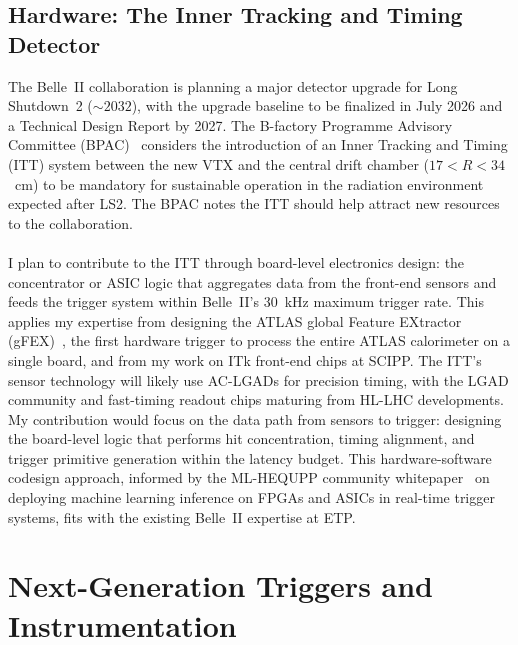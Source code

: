 \documentclass[10pt,a4paper,sans]{moderncv} %
\begin{document}
\subsection{Hardware: The Inner Tracking and Timing Detector}
The Belle~II collaboration is planning a major detector upgrade for Long Shutdown~2 ($\sim 2032$), with the upgrade baseline to be finalized in July 2026 and a Technical Design Report by 2027. The B-factory Programme Advisory Committee (BPAC)~\cite{BPAC2026} considers the introduction of an Inner Tracking and Timing (ITT) system between the new VTX and the central drift chamber ($17 < R < 34$~cm) to be mandatory for sustainable operation in the radiation environment expected after LS2. The BPAC notes the ITT should help attract new resources to the collaboration.
\\
\\
I plan to contribute to the ITT through board-level electronics design: the concentrator or ASIC logic that aggregates data from the front-end sensors and feeds the trigger system within Belle~II's 30~kHz maximum trigger rate. This applies my expertise from designing the ATLAS global Feature EXtractor (gFEX)~\cite{Begel:2233958,Tang:2104248}, the first hardware trigger to process the entire ATLAS calorimeter on a single board, and from my work on ITk front-end chips at SCIPP. The ITT's sensor technology will likely use AC-LGADs for precision timing, with the LGAD community and fast-timing readout chips maturing from HL-LHC developments. My contribution would focus on the data path from sensors to trigger: designing the board-level logic that performs hit concentration, timing alignment, and trigger primitive generation within the latency budget. This hardware-software codesign approach, informed by the ML-HEQUPP community whitepaper~\cite{Gonski:2026jgu} on deploying machine learning inference on FPGAs and ASICs in real-time trigger systems, fits with the existing Belle~II expertise at ETP.

\section{Next-Generation Triggers and Instrumentation}
\end{document}
